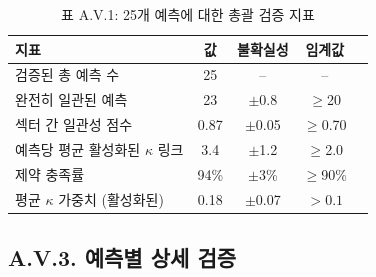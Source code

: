 \documentclass[13pt,a4paper]{article}
\begin{document}
	\begin{table}[H]
		\centering
		\small
		\caption{표 A.V.1: 25개 예측에 대한 총괄 검증 지표}
		\begin{tabular}{p{}cccc}
			\toprule
			\textbf{지표} & \textbf{값} & \textbf{불확실성} & \textbf{임계값} \\
			\midrule
			검증된 총 예측 수 & 25 & -- & -- \\
			완전히 일관된 예측 & 23 & $\pm$0.8 & $\geq$20 \\
			섹터 간 일관성 점수 & 0.87 & $\pm$0.05 & $\geq$0.70 \\
			예측당 평균 활성화된 $\kappa$ 링크 & 3.4 & $\pm$1.2 & $\geq$2.0 \\
			제약 충족률 & 94\% & $\pm$3\% & $\geq$90\% \\
			평균 $\kappa$ 가중치 (활성화된) & 0.18 & $\pm$0.07 & $>0.1$ \\
			\bottomrule
		\end{tabular}
		\label{tab:validation-summary}
	\end{table}
	
	\subsection*{A.V.3. 예측별 상세 검증}
	
\end{document}
